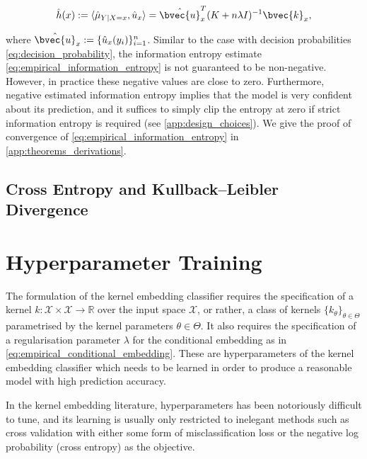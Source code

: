 \documentclass{article}
\begin{document}
	\begin{equation}
		\hat{h}(x) := \langle \hat{\mu}_{Y | X = x}, \hat{u}_{x} \rangle = \hat{\bvec{u}}_{x}^{T} (K + n \lambda I)^{-1} \bvec{k}_{x},
		\label{eq:empirical_information_entropy}
	\end{equation}
	
	where $\hat{\bvec{u}}_{x} := \{\hat{u}_{x}(y_{i})\}_{i = 1}^{n}$. Similar to the case with decision probabilities \eqref{eq:decision_probability}, the information entropy estimate \eqref{eq:empirical_information_entropy} is not guaranteed to be non-negative. However, in practice these negative values are close to zero. Furthermore, negative estimated information entropy implies that the model is very confident about its prediction, and it suffices to simply clip the entropy at zero if strict information entropy is required (see \cref{app:design_choices}). We give the proof of convergence of \eqref{eq:empirical_information_entropy} in \cref{app:theorems_derivations}.

	\subsection{Cross Entropy and Kullback–Leibler Divergence}

\section{Hyperparameter Training}
\label{sec:hyperparameter_learning}

	The formulation of the kernel embedding classifier requires the specification of a kernel $k : \mathcal{X} \times \mathcal{X} \to \mathbb{R}$ over the input space $\mathcal{X}$, or rather, a class of kernels $\{k_{\theta}\}_{\theta \in \Theta}$ parametrised by the kernel parameters $\theta \in \Theta$. It also requires the specification of a regularisation parameter $\lambda$ for the conditional embedding as in \eqref{eq:empirical_conditional_embedding}. These are hyperparameters of the kernel embedding classifier which needs to be learned in order to produce a reasonable model with high prediction accuracy. 

	In the kernel embedding literature, hyperparameters has been notoriously difficult to tune, and its learning is usually only restricted to inelegant methods such as cross validation with either some form of misclassification loss or the negative log probability (cross entropy) as the objective.
\end{document}
